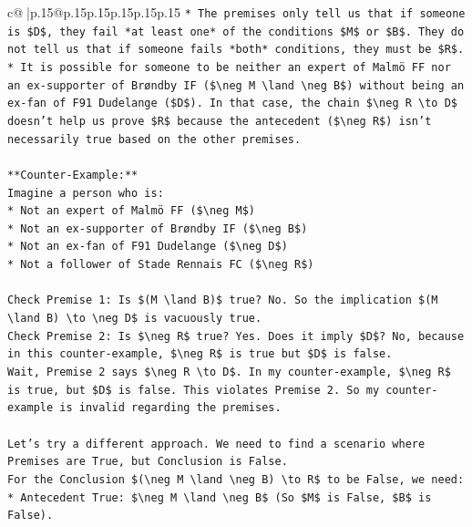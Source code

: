 \documentclass{article}
\begin{document}
{\begin{supertabular}{c@{$\;$}|p{.15\linewidth}@{}p{.15\linewidth}p{.15\linewidth}p{.15\linewidth}p{.15\linewidth}p{.15\linewidth}}
{{{\texttt{*   The premises only tell us that if someone is \$D\$, they fail *at least one* of the conditions \$M\$ or \$B\$. They do not tell us that if someone fails *both* conditions, they must be \$R\$.} \\
\texttt{*   It is possible for someone to be neither an expert of Malmö FF nor an ex{-}supporter of Brøndby IF (\$\textbackslash{}neg M \textbackslash{}land \textbackslash{}neg B\$) without being an ex{-}fan of F91 Dudelange (\$D\$). In that case, the chain \$\textbackslash{}neg R \textbackslash{}to D\$ doesn't help us prove \$R\$ because the antecedent (\$\textbackslash{}neg R\$) isn't necessarily true based on the other premises.} \\
\\ 
\texttt{**Counter{-}Example:**} \\
\texttt{Imagine a person who is:} \\
\texttt{*   Not an expert of Malmö FF (\$\textbackslash{}neg M\$)} \\
\texttt{*   Not an ex{-}supporter of Brøndby IF (\$\textbackslash{}neg B\$)} \\
\texttt{*   Not an ex{-}fan of F91 Dudelange (\$\textbackslash{}neg D\$)} \\
\texttt{*   Not a follower of Stade Rennais FC (\$\textbackslash{}neg R\$)} \\
\\ 
\texttt{Check Premise 1: Is \$(M \textbackslash{}land B)\$ true? No. So the implication \$(M \textbackslash{}land B) \textbackslash{}to \textbackslash{}neg D\$ is vacuously true.} \\
\texttt{Check Premise 2: Is \$\textbackslash{}neg R\$ true? Yes. Does it imply \$D\$? No, because in this counter{-}example, \$\textbackslash{}neg R\$ is true but \$D\$ is false.} \\
\texttt{Wait, Premise 2 says \$\textbackslash{}neg R \textbackslash{}to D\$. In my counter{-}example, \$\textbackslash{}neg R\$ is true, but \$D\$ is false. This violates Premise 2. So my counter{-}example is invalid regarding the premises.} \\
\\ 
\texttt{Let's try a different approach. We need to find a scenario where Premises are True, but Conclusion is False.} \\
\texttt{For the Conclusion \$(\textbackslash{}neg M \textbackslash{}land \textbackslash{}neg B) \textbackslash{}to R\$ to be False, we need:} \\
\texttt{*   Antecedent True: \$\textbackslash{}neg M \textbackslash{}land \textbackslash{}neg B\$ (So \$M\$ is False, \$B\$ is False).} \\
}}}
\end{supertabular}}
\end{document}
